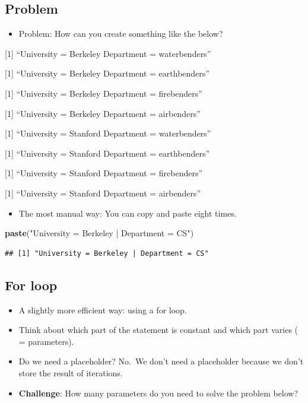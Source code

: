 \documentclass[
]{book}
\newenvironment{Shaded}{\begin{snugshade}}{\end{snugshade}}
\newcommand{\FunctionTok}[1]{\textcolor[rgb]{0.13,0.29,0.53}{\textbf{#1}}}
\newcommand{\NormalTok}[1]{#1}
\newcommand{\StringTok}[1]{\textcolor[rgb]{0.31,0.60,0.02}{#1}}
\providecommand{\tightlist}{%
  \setlength{\itemsep}{0pt}\setlength{\parskip}{0pt}}
\begin{document}
\subsection{Problem}\label{problem}

\begin{itemize}
\tightlist
\item
  Problem: How can you create something like the below?
\end{itemize}

{[}1{]} ``University = Berkeley \textbar{} Department = waterbenders''

{[}1{]} ``University = Berkeley \textbar{} Department = earthbenders''

{[}1{]} ``University = Berkeley \textbar{} Department = firebenders''

{[}1{]} ``University = Berkeley \textbar{} Department = airbenders''

{[}1{]} ``University = Stanford \textbar{} Department = waterbenders''

{[}1{]} ``University = Stanford \textbar{} Department = earthbenders''

{[}1{]} ``University = Stanford \textbar{} Department = firebenders''

{[}1{]} ``University = Stanford \textbar{} Department = airbenders''

\begin{itemize}
\tightlist
\item
  The most manual way: You can copy and paste eight times.
\end{itemize}

\begin{Shaded}
\begin{Highlighting}[]
\FunctionTok{paste}\NormalTok{(}\StringTok{"University = Berkeley | Department = CS"}\NormalTok{)}
\end{Highlighting}
\end{Shaded}

\begin{verbatim}
## [1] "University = Berkeley | Department = CS"
\end{verbatim}

\subsection{For loop}\label{for-loop-1}

\begin{itemize}
\item
  A slightly more efficient way: using a for loop.
\item
  Think about which part of the statement is constant and which part varies ( = parameters).\\
\item
  Do we need a placeholder? No.~We don't need a placeholder because we don't store the result of iterations.
\item
  \textbf{Challenge}: How many parameters do you need to solve the problem below?
\end{itemize}
\end{document}
